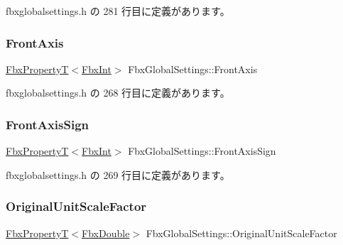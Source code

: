  fbxglobalsettings.\+h の 281 行目に定義があります。

\mbox{\label{class_fbx_global_settings_a48a64f3e8d881ee0f44053786561a59a}} 
\subsubsection{\texorpdfstring{Front\+Axis}{FrontAxis}}
{\footnotesize\ttfamily \hyperlink{class_fbx_property_t}{Fbx\+PropertyT}$<$\hyperlink{fbxtypes_8h_a088fa96de3b0b3ea69f0f6afef525dfb}{Fbx\+Int}$>$ Fbx\+Global\+Settings\+::\+Front\+Axis\hspace{0.3cm}{\ttfamily [protected]}}



 fbxglobalsettings.\+h の 268 行目に定義があります。

\mbox{\label{class_fbx_global_settings_a9e73a39a5c1d4df68b7a5d7efc668ddd}} 
\subsubsection{\texorpdfstring{Front\+Axis\+Sign}{FrontAxisSign}}
{\footnotesize\ttfamily \hyperlink{class_fbx_property_t}{Fbx\+PropertyT}$<$\hyperlink{fbxtypes_8h_a088fa96de3b0b3ea69f0f6afef525dfb}{Fbx\+Int}$>$ Fbx\+Global\+Settings\+::\+Front\+Axis\+Sign\hspace{0.3cm}{\ttfamily [protected]}}



 fbxglobalsettings.\+h の 269 行目に定義があります。

\mbox{\label{class_fbx_global_settings_aacabbbe70923f27acded514e698ad399}} 
\subsubsection{\texorpdfstring{Original\+Unit\+Scale\+Factor}{OriginalUnitScaleFactor}}
{\footnotesize\ttfamily \hyperlink{class_fbx_property_t}{Fbx\+PropertyT}$<$\hyperlink{fbxtypes_8h_a171e72a1c46fc15c1a6c9c31948c1c5b}{Fbx\+Double}$>$ Fbx\+Global\+Settings\+::\+Original\+Unit\+Scale\+Factor\hspace{0.3cm}{\ttfamily [protected]}}



